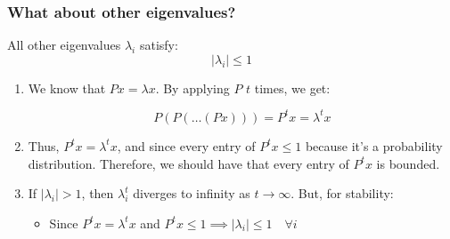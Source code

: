 \subsubsection{What about other eigenvalues?}
\begin{definition}
    All other eigenvalues $\lambda_i$ satisfy:    
        \[
        |\lambda_i| \leq 1
        \]
\end{definition}

\begin{derivation}
    \begin{enumerate}
        \item We know that $P x = \lambda x$. By applying $P$ $t$ times, we get:

        \[
        P(P(\dots(Px))) = P^t x = \lambda^t x
        \]
        
        \item Thus, $P^t x = \lambda^t x$, and since every entry of $P^t x \leq 1$ because it's a probability distribution. Therefore, we should have that every entry of $P^t x$ is bounded.
        
        \item If $|\lambda_i| > 1$, then $\lambda_i^t$ diverges to infinity as $t \to \infty$. But, for stability:
        \begin{itemize}
            \item Since $P^t x = \lambda^t x$ and $P^t x \leq 1 \implies |\lambda_i| \leq 1 \quad \forall i$
        \end{itemize}
    \end{enumerate}
\end{derivation}

